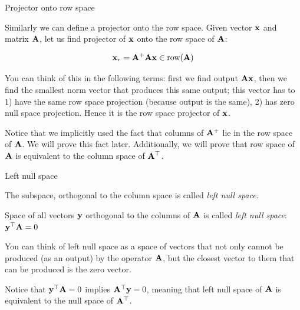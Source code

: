 \documentclass{beamer}
\begin{document}
\begin{frame}{Projector onto row space}
	\begin{flushleft}
		
		Similarly we can define a projector onto the row space. Given vector $\mathbf{x}$ and matrix $\mathbf{A}$, let us find projector of $\mathbf{x}$ onto the row space of $\mathbf{A}$:
		
		\begin{equation}
			\mathbf{x}_r = \mathbf{A}^+\mathbf{A} \mathbf{x} \in \text{row}(\mathbf{A})
		\end{equation}
		
		You can think of this in the following terms: first we find output $\mathbf{A} \mathbf{x}$, then we find the smallest norm vector that produces this same output; this vector has to 1) have the same row space projection (because output is the same), 2) has zero null space projection. Hence it is the row space projector of $\mathbf{x}$.
		
		\bigskip
		
		Notice that we implicitly used the fact that columns of $\mathbf{A}^+$ lie in the row space of $\mathbf{A}$. We will prove this fact later. Additionally, we will prove that row space of $\mathbf{A}$ is equivalent to the column space of $\mathbf{A}^\top$.
		
	\end{flushleft}
\end{frame}




\begin{frame}{Left null space}
	\begin{flushleft}
		
		The subspace, orthogonal to the column space is called \emph{left null space}.
		
		\bigskip
		
		\begin{definition}
			Space of all vectors $\mathbf{y}$ orthogonal to the columns of $\mathbf{A}$ is called \emph{left null space}: $\mathbf{y}^\top\mathbf{A} = 0$
		\end{definition}
		
		You can think of left null space as a space of vectors that not only cannot be produced (as an output) by the operator $\mathbf{A}$, but the closest vector to them that can be produced is the zero vector.
		
		\bigskip
		
		Notice that $\mathbf{y}^\top \mathbf{A} = 0$ implies $\mathbf{A}^\top \mathbf{y} = 0$, meaning that left null space of $\mathbf{A}$ is equivalent to the null space of $\mathbf{A}^\top$.
		
		
	\end{flushleft}
\end{frame}
\end{document}
